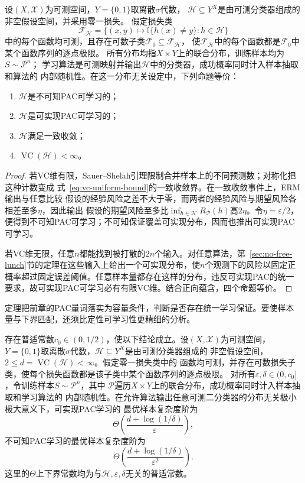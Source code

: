 \begin{theorem}[二分类学习基本定理]
\label{thm:binary-fundamental-theorem}
设$(X,\mathcal X)$为可测空间，$Y=\{0,1\}$取离散$\sigma$代数，
$\mathcal H\subseteq Y^X$是由可测分类器组成的非空假设空间，并采用零一损失。
假定损失类
\[
 \mathcal F_{\mathcal H}
 =\{(x,y)\mapsto\mathbb I\{h(x)\neq y\}:h\in\mathcal H\}
\]
中的每个函数均可测，且存在可数子类$\mathcal F_0\subseteq\mathcal F_{\mathcal H}$，
使$\mathcal F_{\mathcal H}$中的每个函数都是$\mathcal F_0$中某个函数序列的逐点极限。
所有分布均指$X\times Y$上的联合分布，训练样本均为$S\sim\mathcal P^n$；
学习算法是可测映射并输出$\mathcal H$中的分类器，成功概率同时计入样本抽取和算法的
内部随机性。在这一分布无关设定中，下列命题等价：
\begin{enumerate}
 \item $\mathcal H$是不可知PAC可学习的；
 \item $\mathcal H$是可实现PAC可学习的；
 \item $\mathcal H$满足一致收敛；
 \item $\operatorname{VC}(\mathcal H)<\infty$。
\end{enumerate}
\end{theorem}
\begin{proof}
若VC维有限，Sauer--Shelah引理限制合并样本上的不同预测数；对称化把这种计数变成
式~\eqref{eq:vc-uniform-bound}的一致收敛界。在一致收敛事件上，ERM输出与任意比较
假设的经验风险之差不大于零，而两者的经验风险与期望风险各相差至多$\eta$，因此输出
假设的期望风险至多比$\inf_{h\in\mathcal H}R_{\mathcal P}(h)$高$2\eta$。令$\eta=\varepsilon/2$，
便得到不可知PAC可学习；不可知保证覆盖可实现分布，因而也推出可实现PAC可学习。

若VC维无限，任意$n$都能找到被打散的$2n$个输入。对任意算法，第~\ref{sec:no-free-lunch}节的定理在这些输入上给出一个可实现分布，使$n$个观测下的风险以固定正概率超过固定误差阈值。任意样本量都存在这样的分布，违反可实现PAC的统一要求，故可实现PAC可学习必有有限VC维。结合正向蕴含，四个命题等价。
\end{proof}

定理把前章的PAC量词落实为容量条件，判断是否存在统一学习保证。要使样本量与下界匹配，还须比定性可学习性更精细的分析。

\begin{theorem}[二分类的最优样本复杂度阶]
\label{thm:binary-optimal-sample-complexity}
存在普适常数$c_0\in(0,1/2)$，使以下结论成立。设$(X,\mathcal X)$为可测空间，
$Y=\{0,1\}$取离散$\sigma$代数，$\mathcal H\subseteq Y^X$是由可测分类器组成的
非空假设空间，$2\leq d=\operatorname{VC}(\mathcal H)<\infty$。假定零一损失类中的
函数均可测，并存在可数损失子类，使每个损失函数都是该子类中某个函数序列的逐点极限。
对所有$\varepsilon,\delta\in(0,c_0]$，令训练样本$S\sim\mathcal P^n$，其中
$\mathcal P$遍历$X\times Y$上的联合分布，成功概率同时计入样本抽取和学习算法的
内部随机性。在允许算法输出任意可测二分类器的分布无关极小极大意义下，可实现PAC学习的
最优样本复杂度阶为
\[
 \Theta\left(\frac{d+\log(1/\delta)}{\varepsilon}\right),
\]
不可知PAC学习的最优样本复杂度阶为
\[
 \Theta\left(\frac{d+\log(1/\delta)}{\varepsilon^2}\right).
\]
这里的$\Theta$上下界常数均为与$\mathcal H,\varepsilon,\delta$无关的普适常数。
\end{theorem}

